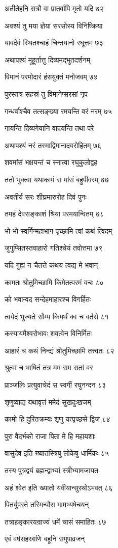 अतीतेहनि रात्रौ वा प्रातर्वापि मृतो यदि ७२

अवश्यं तु मया ज्ञेया सरसोस्य विनिष्क्रिया

यावदेवं स्थितश्चाहं चिन्तयानो रघूत्तम ७३

अथापश्यं मूहूर्तात्तु दिव्यमद्भुतदर्शनम्

विमानं परमोदारं हंसयुक्तं मनोजवम् ७४

पुरस्तत्र सहस्रं तु विमानेप्सरसां नृप

गन्धर्वाश्चैव तत्सङ्ख्या रमयन्ति वरं नरम् ७५

गायन्ति दिव्यगेयानि वादयन्ति तथा परे

अथापश्यं नरं तस्माद्विमानादवरोहितम् ७६

शवमांसं भक्षयन्तं च स्नात्वा रघुकुलोद्वह

ततो भुक्त्वा यथाकामं स मांसं बहुपीवरम् ७७

अवतीर्य सरः शीघ्रमारुरोह दिवं पुनः

तमहं देवसङ्काशं श्रिया परमयान्वितम् ७८

भो भो स्वर्गिन्महाभाग पृच्छामि त्वां कथं त्विदम्

जुगुप्सितस्तवाहारो गतिश्चेयं तवोत्तमा ७९

यदि गुह्यं न चैतत्ते कथय त्वद्य मे भवान्

कामतः श्रोतुमिच्छामि किमेतत्परमं वचः ८०

को भवान्वद सन्देहमाहारश्च विगर्हितः

त्वयेदं भुज्यते सौम्य किमर्थं क्व च वर्तसे ८१

कस्यायमैश्वरोभावः शवत्वेन विनिर्मितः

आहारं च कथं निन्द्यं श्रोतुमिच्छामि तत्त्वतः ८२

श्रुत्वा च भाषितं तत्र मम राम सतां वर

प्राञ्जलिः प्रत्युवाचेदं स स्वर्गी रघुनन्दन ८३

शृणुष्वाद्य यथावृत्तं ममेदं सुखदुःखजम्

कामो हि दुरितक्रम्यः शृणु यत्पृच्छसे द्विज ८४

पुरा वैदर्भको राजा पिता मे हि महायशाः

वासुदेव इति ख्यातस्त्रिषु लोकेषु धार्मिकः ८५

तस्य पुत्रद्वयं ब्रह्मन्द्वाभ्यां स्त्रीभ्यामजायत

अहं श्वेत इति ख्यातो यवीयान्सुरथोऽभवत् ८६

पितर्युपरते तस्मिन्पौरा मामभ्यषेचयन्

तत्राहङ्कारयन्राज्यं धर्मे चासं समाहितः ८७

एवं वर्षसहस्राणि बहूनि समुपाव्रजन्

